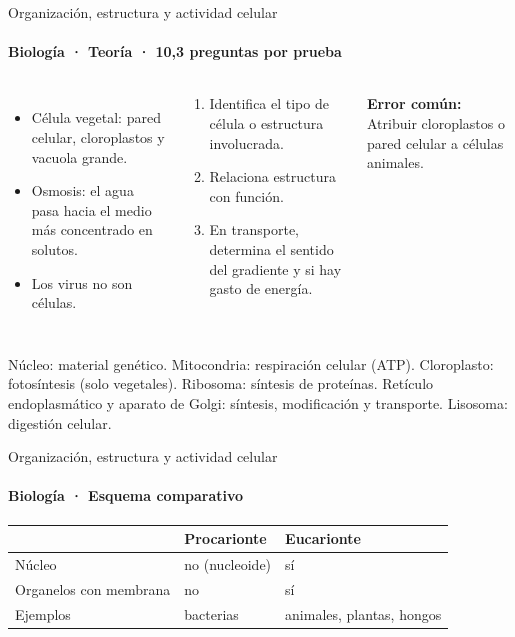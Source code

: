 \documentclass[aspectratio=169,11pt]{beamer}
\newlength{\ajustealto}
\newenvironment{ajustar}[1][0.74\textheight]
  {\setlength{\ajustealto}{#1}\begin{lrbox}{\ajustecaja}\begin{minipage}{\textwidth}}
  {\end{minipage}\end{lrbox}%
   \ifdim\dimexpr\ht\ajustecaja+\dp\ajustecaja\relax>\ajustealto
     \resizebox*{!}{\ajustealto}{\usebox{\ajustecaja}}\else\usebox{\ajustecaja}\fi}
\begin{document}
\begin{frame}{Organización, estructura y actividad celular}
\label{tema-cs-celula}
\framesubtitle{Biología · Teoría · 10,3 preguntas por prueba}
\begin{ajustar}
\begin{columns}[T,onlytextwidth]
\begin{itemize}\footnotesize
\item Célula vegetal: pared celular, cloroplastos y vacuola grande.
\item Osmosis: el agua pasa hacia el medio más concentrado en solutos.
\item Los virus no son células.
\end{itemize}
\begin{cajaregla}\scriptsize \begin{enumerate}\item Identifica el tipo de célula o estructura involucrada.\item Relaciona estructura con función.\item En transporte, determina el sentido del gradiente y si hay gasto de energía.\end{enumerate}\end{cajaregla}
\begin{notagris}\scriptsize \textbf{Error común:} Atribuir cloroplastos o pared celular a células animales.\end{notagris}
\end{columns}
\begin{cajaclave}\footnotesize
Núcleo: material genético. Mitocondria: respiración celular (ATP). Cloroplasto: fotosíntesis (solo vegetales). Ribosoma: síntesis de proteínas. Retículo endoplasmático y aparato de Golgi: síntesis, modificación y transporte. Lisosoma: digestión celular.
\end{cajaclave}
\end{ajustar}
\end{frame}

\begin{frame}{Organización, estructura y actividad celular}
\framesubtitle{Biología · Esquema comparativo}
\begin{center}\footnotesize
\begin{tabular}{@{}>{\raggedright\arraybackslash}p{\dimexpr(\linewidth-4\tabcolsep)/3\relax}>{\raggedright\arraybackslash}p{\dimexpr(\linewidth-4\tabcolsep)/3\relax}>{\raggedright\arraybackslash}p{\dimexpr(\linewidth-4\tabcolsep)/3\relax}@{}}
\toprule
 & \textbf{Procarionte} & \textbf{Eucarionte} \\
\midrule
Núcleo & no (nucleoide) & sí \\
Organelos con membrana & no & sí \\
Ejemplos & bacterias & animales, plantas, hongos \\
\bottomrule
\end{tabular}
\end{center}
\end{frame}
\end{document}
